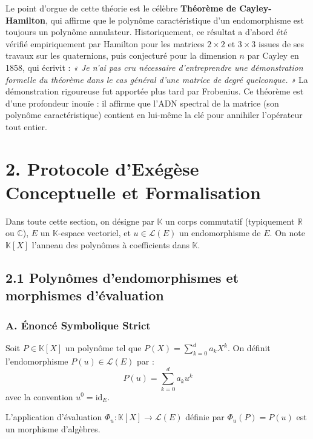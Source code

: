 \documentclass[11pt,a4paper]{article}
\begin{document}
Le point d'orgue de cette théorie est le célèbre \textbf{Théorème de Cayley-Hamilton}, qui affirme que le polynôme caractéristique d'un endomorphisme est toujours un polynôme annulateur. Historiquement, ce résultat a d'abord été vérifié empiriquement par Hamilton pour les matrices $2 \times 2$ et $3 \times 3$ issues de ses travaux sur les quaternions, puis conjecturé pour la dimension $n$ par Cayley en 1858, qui écrivit : \textit{« Je n'ai pas cru nécessaire d'entreprendre une démonstration formelle du théorème dans le cas général d'une matrice de degré quelconque. »} La démonstration rigoureuse fut apportée plus tard par Frobenius. Ce théorème est d'une profondeur inouïe : il affirme que l'ADN spectral de la matrice (son polynôme caractéristique) contient en lui-même la clé pour annihiler l'opérateur tout entier.

\section{2. Protocole d'Exégèse Conceptuelle et Formalisation}

Dans toute cette section, on désigne par $\mathbb{K}$ un corps commutatif (typiquement $\mathbb{R}$ ou $\mathbb{C}$), $E$ un $\mathbb{K}$-espace vectoriel, et $u \in \mathcal{L}(E)$ un endomorphisme de $E$. On note $\mathbb{K}[X]$ l'anneau des polynômes à coefficients dans $\mathbb{K}$.

\subsection{2.1 Polynômes d'endomorphismes et morphismes d'évaluation}

\subsubsection{A. Énoncé Symbolique Strict}
Soit $P \in \mathbb{K}[X]$ un polynôme tel que $P(X) = \sum_{k=0}^d a_k X^k$. On définit l'endomorphisme $P(u) \in \mathcal{L}(E)$ par :
$$P(u) = \sum_{k=0}^d a_k u^k$$
avec la convention $u^0 = \text{id}_E$.

L'application d'évaluation $\Phi_u : \mathbb{K}[X] \to \mathcal{L}(E)$ définie par $\Phi_u(P) = P(u)$ est un morphisme d'algèbres.


\end{document}
